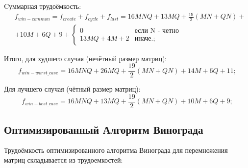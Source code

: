 Cуммарная трудоёмкость:
\begin{equation}
	\label{for:common}
	\begin{split}
		&f_{win-common}=f_{create}+f_{cycle}+f_{last}=16MNQ+13MQ+\frac{19}{2}(MN+QN)+\\
		&+10M+6Q+9+\begin{cases}0 & \text{если N - четно}\\13MQ+4M+2 & \text{иначе.};\end{cases}
	\end{split}
\end{equation}


Итого, для худшего случая (нечётный размер матриц): 
\begin{equation}
	\label{for:worst}
	f_{win-worst\_case} = 16MNQ+26MQ+\frac{19}{2}(MN+QN)+14M+6Q+11;
\end{equation}

Для лучшего случая (чётный размер матриц): 
\begin{equation}
	\label{for:best}
	f_{win-best\_case} = 16MNQ+13MQ+\frac{19}{2}(MN+QN)+10M+6Q+9;
\end{equation}

\subsection{Оптимизированный Алгоритм Винограда}

Трудоёмкость оптимизированного алгоритма Винограда для перемножения матриц складывается из трудоемкостей:

